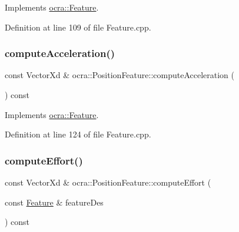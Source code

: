 Implements \hyperlink{classocra_1_1Feature_a4a5973d27459d2dececec8dc73038df8}{ocra\+::\+Feature}.



Definition at line 109 of file Feature.\+cpp.

\hypertarget{classocra_1_1PositionFeature_ad8cc562d88824f58ee21a1b1476edd4b}{}\label{classocra_1_1PositionFeature_ad8cc562d88824f58ee21a1b1476edd4b} 
\subsubsection{\texorpdfstring{compute\+Acceleration()}{computeAcceleration()}\hspace{0.1cm}{\footnotesize\ttfamily [2/2]}}
{\footnotesize\ttfamily const Vector\+Xd \& ocra\+::\+Position\+Feature\+::compute\+Acceleration (\begin{DoxyParamCaption}{ }\end{DoxyParamCaption}) const\hspace{0.3cm}{\ttfamily [virtual]}}



Implements \hyperlink{classocra_1_1Feature_aa42b61d4255116caa92042d01ca36b79}{ocra\+::\+Feature}.



Definition at line 124 of file Feature.\+cpp.

\hypertarget{classocra_1_1PositionFeature_a9cb07e0db4d84c5faa228676712e9120}{}\label{classocra_1_1PositionFeature_a9cb07e0db4d84c5faa228676712e9120} 
\subsubsection{\texorpdfstring{compute\+Effort()}{computeEffort()}\hspace{0.1cm}{\footnotesize\ttfamily [1/2]}}
{\footnotesize\ttfamily const Vector\+Xd \& ocra\+::\+Position\+Feature\+::compute\+Effort (\begin{DoxyParamCaption}\item[{const \hyperlink{classocra_1_1Feature}{Feature} \&}]{feature\+Des }\end{DoxyParamCaption}) const\hspace{0.3cm}{\ttfamily [virtual]}}



